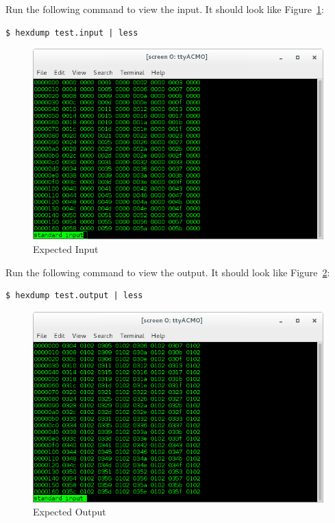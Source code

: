 \pagebreak
Run the following command to view the input. It should look like Figure~\ref{fig:inBias1}: \\
\begin{verbatim}
$ hexdump test.input | less
\end{verbatim}
\begin{figure}[H]
	\centerline{\includegraphics[scale=0.5]{zed_bias_input}}
	\caption{Expected Input}
	\label{fig:inBias1}
\end{figure}

Run the following command to view the output. It should look like Figure~\ref{fig:outBias1}: \\
\begin{verbatim}
$ hexdump test.output | less
\end{verbatim}
\begin{figure}[H]
	\centerline{\includegraphics[scale=0.5]{zed_bias_output}}
	\caption{Expected Output}
	\label{fig:outBias1}
\end{figure}


